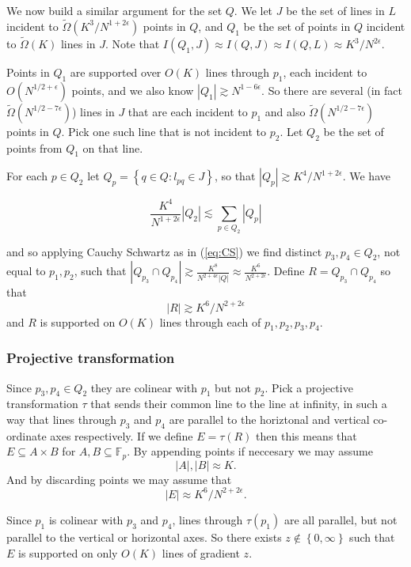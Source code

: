 \documentclass[12pt]{article}
\begin{document}
We now build a similar argument for the set $Q$. We let $J$ be the set of lines in $L$ incident to $\widetilde{\Omega}\left(K^3/N^{1+2\epsilon}\right)$ points in $Q$, and $Q_1$ be the set of points in $Q$ incident to $\widetilde{\Omega}\left(K\right)$ lines in $J$. Note that $I(Q_1,J)\approx I(Q,J)\approx I(Q,L)\approx K^3/N^{2\epsilon}$.

Points in $Q_1$ are supported over $O(K)$ lines through $p_1$, each incident to $O(N^{1/2+\epsilon})$ points, and we also know $|Q_1|\gtrsim N^{1-6 \epsilon}$. So there are several (in fact $\widetilde{\Omega}(N^{1/2-7\epsilon})$) lines in $J$ that are each incident to $p_1$ and also $\widetilde{\Omega}(N^{1/2-7\epsilon})$ points in $Q$. Pick one such line that is not incident to $p_2$. Let $Q_2$ be the set of points from $Q_1$ on that line.

For each $p \in Q_2$ let $Q_p=\left\{q \in Q:l_{pq}\in J\right\}$, so that $|Q_p|\gtrsim K^4/N^{1+2 \epsilon}$. We have 

$$\frac{K^4}{N^{1+2\epsilon}}|Q_2|\lesssim \sum_{p \in Q_2}|Q_p|$$

and so applying Cauchy Schwartz as in (\ref{eq:CS}) we find distinct $p_3,p_4 \in Q_2$, not equal to $p_1,p_2$, such that $|Q_{p_3}\cap Q_{p_4}|\gtrsim \frac{K^8}{N^{2+4\epsilon}|Q|}\approx  \frac{K^6}{N^{2+2\epsilon}}$. Define $R= Q_{p_3}\cap Q_{p_4}$ so that $$|R|\gtrsim K^6/N^{2+2 \epsilon}$$ and $R$ is supported on $O(K)$ lines through each of $p_1,p_2,p_3,p_4$.

\subsubsection{Projective transformation}

Since $p_3,p_4 \in Q_2$ they are colinear with $p_1$ but not $p_2$. Pick a projective transformation $\tau$ that sends their common line to the line at infinity, in such a way that lines through $p_3$ and $p_4$ are parallel to the horiztonal and vertical co-ordinate axes respectively. If we define $E=\tau(R)$ then this means that $E \subseteq A \times B$ for $A,B \subseteq \mathbb{F}_p$. By appending points if neccesary we may assume $$|A|,|B| \approx K.$$ And by discarding points we may assume that $$|E|\approx K^6/N^{2+2 \epsilon}.$$

Since $p_1$ is colinear with $p_3$ and $p_4$, lines through $\tau(p_1)$ are all parallel, but not parallel to the vertical or horizontal axes. So there exists $z \notin \left\{0,\infty\right\}$ such that $E$ is supported on only $O(K)$ lines of gradient $z$. 
\end{document}
